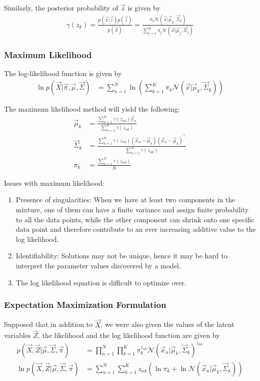 \documentclass[12pt,twoside]{article}
\begin{document}
Similarly, the posterior probability of $\vec{z}$ is given by
\begin{align*}
	\gamma (z_k) = \frac{p(\vec{x}\vert \vec{z})p(\vec{z})}{p(\vec{x})} = \frac{\pi_k \mathcal{N}(\vec{x}\vert \vec{\mu}_k, \vec{\Sigma}_k) }{\sum_{j=1}^K \pi_j\mathcal{N}(\vec{x}\vert \vec{\mu}_j, \vec{\Sigma}_j)}
\end{align*}

\subsubsection{Maximum Likelihood}
The log-likelihood function is given by
\begin{align*}
	\ln p(\vec{X} \vert \vec{\pi}, \vec{\mu}, \vec{\Sigma})&=\sum_{n=1}^N \ln\left(\sum_{k=1}^K \pi_k\mathcal{N}(\vec{x}\vert \vec{\mu}_k, 	\vec{\Sigma}_k)\right)
\end{align*}

The maximum likelihood method will yield the following:
\begin{align*}
	\vec{\mu}_k & = \frac{\sum_{n=1}^N \gamma(z_{nk})\vec{x}_n}{\sum_{n=1}^N \gamma(z_{nk})}\\
	\vec{\Sigma}_k& = \frac{\sum_{n=1}^N \gamma(z_{nk})(\vec{x}_n-\vec{\mu}_k)(\vec{x}_n-\vec{\mu}_k)^\top}{\sum_{n=1}^N \gamma(z_{nk})}\\
	\pi_k&= \frac{\sum_{n=1}^N \gamma(z_{nk})}{N}
\end{align*}

Issues with maximum likelihood:
\begin{enumerate}
	\item Presence of singularities: When we have at least two components in the mixture, one of them can have a finite variance and assign finite probability to all the data points, while the other component can shrink onto one specific data point and therefore contribute to an ever increasing additive value to the log likelihood.
	\item Identifiability: Solutions may not be unique, hence it may be hard to interpret the parameter values discovered by a model.
	\item The log likelihood equation is difficult to optimize over.
\end{enumerate}


\subsubsection{Expectation Maximization Formulation}
Supposed that in addition to $\vec{X}$, we were also given the values of the latent variables $\vec{Z}$, the likelihood and the log likelihood function are given by
\begin{align*}
	p(\vec{X}, \vec{Z}\vert \vec{\mu}, \vec{\Sigma}, \vec{\pi})& =\prod_{n=1}^{N}\prod_{k=1}^{K} \pi_k^{z_{nk}}\mathcal{N}(\vec{x}_n\vert \vec{\mu}_k, \vec{\Sigma}_k)^{z_{nk}}\\
	\ln p(\vec{X}, \vec{Z}\vert \vec{\mu}, \vec{\Sigma}, \vec{\pi})& =\sum_{n=1}^{N}\sum_{k=1}^{K} z_{nk}\left(\ln \pi_k + \ln \mathcal{N}(\vec{x}_n\vert \vec{\mu}_k, \vec{\Sigma}_k)\right)
\end{align*}
\end{document}

